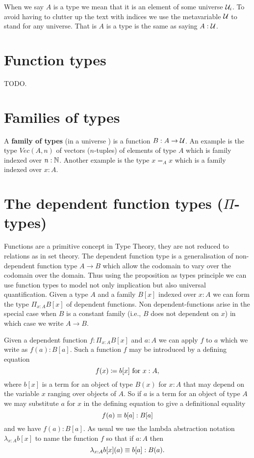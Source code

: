 When we say $A$ is a type we mean that it is an element of some
universe $\mathcal{U}_i$. To avoid having to clutter up the text with indices
we use the metavariable $\mathcal{U}$ to stand for any universe. That is $A$
is a type is the same as saying $A : \mathcal{U}$.


\section{Function types}
\label{sec:function-types}

TODO.


\section{Families of types}
\label{sec:families-of-types}

A \textbf{family of types} (in a universe \UU) is a function $B:A\to\mathcal{U}$.
An example is the type $Vec(A,n)$ of
vectors ($n$-tuples) of elements of type $A$ which is family indexed
over $n : \mathbb{N}$. Another example is the type $x =_A x$ which is a
family indexed over $x : A$.


\section{The dependent function types ($\Pi$-types)}
\label{sec:pi-types}

Functions are a primitive concept in Type Theory, they are not reduced
to relations as in set theory. The dependent function type is a
generalisation of non-dependent function type $A \to B$ which allow
the codomain to vary over the codomain over the domain. Thus using the
proposition as types principle we can use function types to model not
only implication but also universal quantification. Given a type $A$
and a family $B[x]$ indexed over $x:A$ we can form the type
$\Pi_{x:A}B[x]$ of dependent functions. Non dependent-functions arise
in the special case when $B$ is a constant family (i.e., $B$ does not
dependent on $x$) in which case we write $A \to B$.

Given a dependent function $f : \Pi_{x:A}B[x]$ and $a : A$ we can
apply $f$ to $a$ which we write as $f(a) : B[a]$.  Such a function $f$ may be introduced by a defining equation
  \[ f(x)\coloneqq b[x]\mbox{ for } x:A,\]
where $b[x]$ is a term for an object of type $B(x)$ for $x:A$ that may depend on the variable $x$ ranging over objects of $A$.  So if $a$ is a term for an object of type $A$ we may substitute $a$ for $x$ in the defining equation to give a definitional equality
  \[ f(a)\equiv b[a]:B[a]\]
and we have $f(a):B[a]$.  As usual we use the lambda abstraction notation 
$\lambda_{x:A}b[x]$ to name the function $f$ so that if $a:A$ then
  \[\lambda_{x:A}b[x](a)\equiv b[a]: B(a).\]

